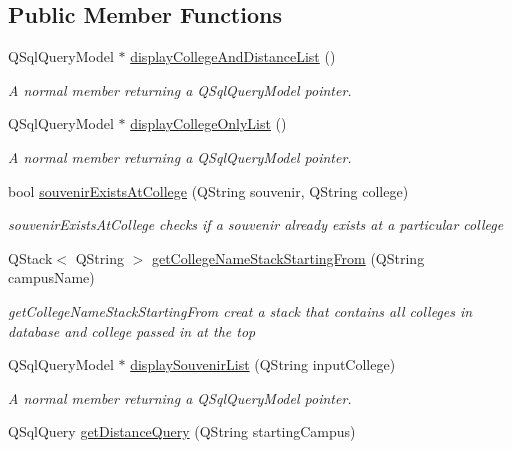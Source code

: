 \subsection*{Public Member Functions}
\begin{DoxyCompactItemize}
\item 
Q\+Sql\+Query\+Model $\ast$ \hyperlink{class_database_a6037c904ea4053908cefb67c2d05bd29}{display\+College\+And\+Distance\+List} ()
\begin{DoxyCompactList}\small\item\em A normal member returning a Q\+Sql\+Query\+Model pointer. \end{DoxyCompactList}\item 
Q\+Sql\+Query\+Model $\ast$ \hyperlink{class_database_a1979fb1dc3dbf64321c0d0f7e373f08c}{display\+College\+Only\+List} ()
\begin{DoxyCompactList}\small\item\em A normal member returning a Q\+Sql\+Query\+Model pointer. \end{DoxyCompactList}\item 
bool \hyperlink{class_database_a44af624b2b73c7ef7f75ca625302771f}{souvenir\+Exists\+At\+College} (Q\+String souvenir, Q\+String college)
\begin{DoxyCompactList}\small\item\em souvenir\+Exists\+At\+College checks if a souvenir already exists at a particular college \end{DoxyCompactList}\item 
Q\+Stack$<$ Q\+String $>$ \hyperlink{class_database_a72407a60cb8936fecbbe8f4ba694b913}{get\+College\+Name\+Stack\+Starting\+From} (Q\+String campus\+Name)
\begin{DoxyCompactList}\small\item\em get\+College\+Name\+Stack\+Starting\+From creat a stack that contains all colleges in database and college passed in at the top \end{DoxyCompactList}\item 
Q\+Sql\+Query\+Model $\ast$ \hyperlink{class_database_ad4a7631de5e445a2e8668ccbb2e7639c}{display\+Souvenir\+List} (Q\+String input\+College)
\begin{DoxyCompactList}\small\item\em A normal member returning a Q\+Sql\+Query\+Model pointer. \end{DoxyCompactList}\item 
Q\+Sql\+Query \hyperlink{class_database_ac929cf3fc1377642328b63d0d93b47d3}{get\+Distance\+Query} (Q\+String starting\+Campus)

\end{DoxyCompactItemize}
